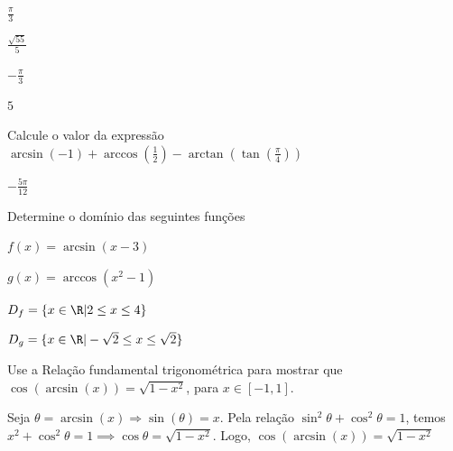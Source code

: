 \begin{exercises*}
\begin{exercise}
  \begin{answer}
    \begin{alphalist}
      \item $\frac{\pi}{3}$
      \item $\frac{\sqrt{55}}{5}$
      \item $-\frac{\pi}{3}$
      \item $5$
    \end{alphalist}
  \end{answer}
\end{exercise}

\begin{exercise}
  Calcule o valor da expressão
  $\arcsin(-1)+\arccos(\frac{1}{2})-\arctan(\tan(\frac{\pi}{4}))$

  \begin{answer}
    $-\frac{5\pi}{12}$
  \end{answer}
\end{exercise}

\begin{exercise}
  Determine o domínio das seguintes funções
  \begin{alphalist}
    \item $f(x)=\arcsin(x-3)$
    \item $g(x)=\arccos(x^2-1)$
  \end{alphalist}

  \begin{answer}
    \begin{alphalist}
      \item $D_f= \{ x \in \R | 2 \leq x \leq 4\}$
      \item $D_g= \{ x \in \R| -\sqrt{2} \leq x \leq \sqrt{2}\}$
    \end{alphalist}
  \end{answer}
\end{exercise}

\begin{exercise}
  Use a Relação fundamental trigonométrica para mostrar que
  $\cos(\arcsin(x))=\sqrt{1-x^2}$, para $x \in [-1,1]$.

  \begin{answer}
    Seja $\theta = \arcsin(x) \Rightarrow \sin(\theta) = x$. Pela relação
    $\sin^2\theta + \cos^2\theta = 1$, temos $x^2 + \cos^2\theta = 1 \implies
    \cos\theta = \sqrt{1-x^2}$. Logo, $\cos(\arcsin(x)) = \sqrt{1-x^2}$
  \end{answer}
\end{exercise}

\end{exercises*}
